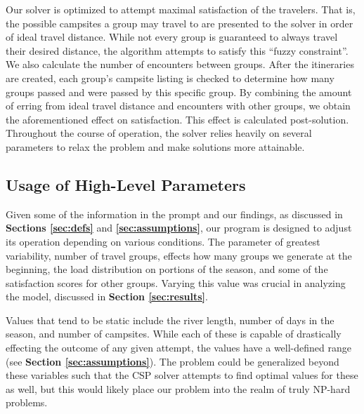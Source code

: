\documentclass[11pt]{article} %
\begin{document}
Our solver is optimized to attempt maximal satisfaction of the travelers.
That is, the possible campsites a group may travel to are presented to the
solver in order of ideal travel distance.  While not every group is guaranteed
to always travel their desired distance, the algorithm attempts to satisfy
this ``fuzzy constraint''.  We also calculate the number of encounters
between groups.  After the itineraries are created, each group's campsite
listing is checked to determine how many groups passed and were passed by
this specific group.  By combining the amount of erring from ideal travel distance
and encounters with other groups, we obtain the aforementioned effect on
satisfaction.  This effect is calculated post-solution.
Throughout the course of operation, the solver relies heavily on several
parameters to relax the problem and make solutions more attainable.

\subsection{Usage of High-Level Parameters}
\label{sec:high-params}
Given some of the information in the prompt and our findings, as discussed
in \textbf{Sections \ref{sec:defs}} and \textbf{\ref{sec:assumptions}}, our program
is designed to adjust its operation depending on various conditions.  The
parameter of greatest variability, number of travel groups, effects how
many groups we generate at the beginning, the load distribution on portions
of the season, and some of the satisfaction scores for other groups. Varying
this value was crucial in analyzing the model, discussed in \textbf{Section
\ref{sec:results}}.

Values that tend to be static include the river length, number of days in
the season, and number of campsites.  While each of these is capable of
drastically effecting the outcome of any given attempt, the values have a
well-defined range (see \textbf{Section \ref{sec:assumptions}}).  The problem
could be generalized beyond these variables such that the CSP solver attempts
to find optimal values for these as well, but this would likely place our
problem into the realm of truly NP-hard problems.
\end{document}
